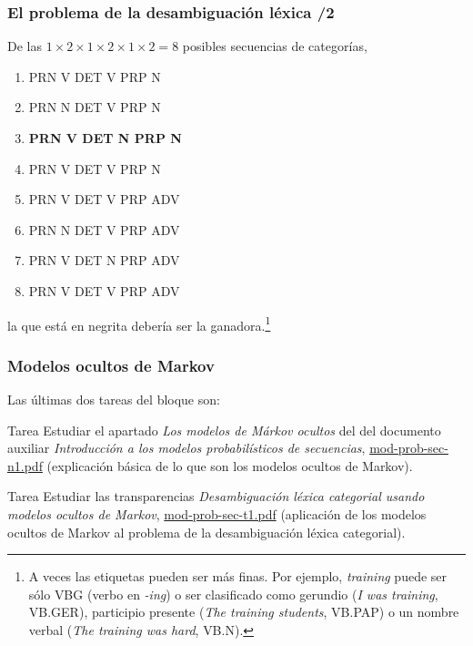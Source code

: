 \begin{frame}
  \frametitle{El problema de la desambiguación léxica /2}
De las \(1\times 2\times 1\times 2 \times 1 \times 2 = 8\) posibles secuencias de categorías,
\begin{enumerate}
\item  PRN V DET V PRP N
\item PRN N DET V PRP N
\item \textbf{PRN V DET N PRP N}
\item PRN V DET V PRP N
\item PRN V DET V PRP ADV
\item PRN N DET V PRP ADV
\item PRN V DET N PRP ADV
\item PRN V DET V PRP ADV
\end{enumerate}
la que está en negrita debería ser la ganadora.\footnote{A veces las etiquetas pueden ser más finas. Por ejemplo, \emph{training} puede ser sólo \textsf{VBG} (verbo en \emph{-ing}) o ser clasificado como gerundio (\emph{I was training}, \textsf{VB.GER}), participio presente (\emph{The training students}, \textsf{VB.PAP}) o un nombre verbal (\emph{The training was hard}, \textsf{VB.N}).}
\end{frame}



\begin{frame}
\frametitle{Modelos ocultos de Markov}

Las últimas dos tareas del bloque son:

\begin{block}{Tarea}
  Estudiar el apartado \emph{Los modelos de Márkov ocultos} del del
  documento auxiliar \emph{Introducción a los modelos probabilísticos
    de secuencias}, \url{mod-prob-sec-n1.pdf} (explicación básica de lo que son los modelos ocultos de Markov).
\end{block}

\begin{block}{Tarea}
Estudiar las transparencias \emph{Desambiguación léxica categorial usando modelos ocultos de Markov}, \url{mod-prob-sec-t1.pdf} (aplicación de los modelos ocultos de Markov al problema de la desambiguación léxica categorial).
\end{block}



  
\end{frame}

